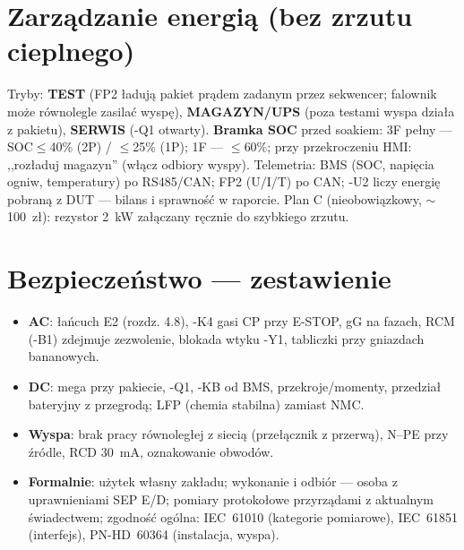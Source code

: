 \documentclass[11pt,a4paper]{article}
\begin{document}
\section{Zarządzanie energią (bez zrzutu cieplnego)}
Tryby: \textbf{TEST} (FP2 ładują pakiet prądem zadanym przez sekwencer; falownik może równolegle
zasilać wyspę), \textbf{MAGAZYN/UPS} (poza testami wyspa działa z pakietu), \textbf{SERWIS}
(-Q1 otwarty). \textbf{Bramka SOC} przed soakiem: 3F pełny --- SOC$\le$40\% (2P) / $\le$25\% (1P);
1F --- $\le$60\%; przy przekroczeniu HMI: ,,rozładuj magazyn'' (włącz odbiory wyspy). Telemetria:
BMS (SOC, napięcia ogniw, temperatury) po RS485/CAN; FP2 (U/I/T) po CAN; -U2 liczy energię pobraną
z DUT --- bilans i sprawność w raporcie. Plan C (nieobowiązkowy, $\sim$100~zł): rezystor 2~kW
załączany ręcznie do szybkiego zrzutu.

\section{Bezpieczeństwo --- zestawienie}
\begin{itemize}
\item \textbf{AC}: łańcuch E2 (rozdz. 4.8), -K4 gasi CP przy E-STOP, gG na fazach, RCM (-B1)
zdejmuje zezwolenie, blokada wtyku -Y1, tabliczki przy gniazdach bananowych.
\item \textbf{DC}: mega przy pakiecie, -Q1, -KB od BMS, przekroje/momenty, przedział bateryjny
z przegrodą; LFP (chemia stabilna) zamiast NMC.
\item \textbf{Wyspa}: brak pracy równoległej z siecią (przełącznik z przerwą), N--PE przy źródle,
RCD 30~mA, oznakowanie obwodów.
\item \textbf{Formalnie}: użytek własny zakładu; wykonanie i odbiór --- osoba z uprawnieniami
SEP E/D; pomiary protokołowe przyrządami z aktualnym świadectwem; zgodność ogólna: IEC~61010
(kategorie pomiarowe), IEC~61851 (interfejs), PN-HD~60364 (instalacja, wyspa).
\end{itemize}
\end{document}
